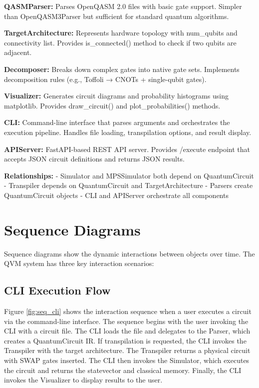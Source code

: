 \textbf{QASMParser:} Parses OpenQASM 2.0 files with basic gate support. Simpler than OpenQASM3Parser but sufficient for standard quantum algorithms.

\textbf{TargetArchitecture:} Represents hardware topology with num\_qubits and connectivity list. Provides is\_connected() method to check if two qubits are adjacent.

\textbf{Decomposer:} Breaks down complex gates into native gate sets. Implements decomposition rules (e.g., Toffoli → CNOTs + single-qubit gates).

\textbf{Visualizer:} Generates circuit diagrams and probability histograms using matplotlib. Provides draw\_circuit() and plot\_probabilities() methods.

\textbf{CLI:} Command-line interface that parses arguments and orchestrates the execution pipeline. Handles file loading, transpilation options, and result display.

\textbf{APIServer:} FastAPI-based REST API server. Provides /execute endpoint that accepts JSON circuit definitions and returns JSON results.

\textbf{Relationships:}
- Simulator and MPSSimulator both depend on QuantumCircuit
- Transpiler depends on QuantumCircuit and TargetArchitecture
- Parsers create QuantumCircuit objects
- CLI and APIServer orchestrate all components

\section{Sequence Diagrams}
Sequence diagrams show the dynamic interactions between objects over time. The QVM system has three key interaction scenarios:

\subsection{CLI Execution Flow}
Figure \ref{fig:seq_cli} shows the interaction sequence when a user executes a circuit via the command-line interface. The sequence begins with the user invoking the CLI with a circuit file. The CLI loads the file and delegates to the Parser, which creates a QuantumCircuit IR. If transpilation is requested, the CLI invokes the Transpiler with the target architecture. The Transpiler returns a physical circuit with SWAP gates inserted. The CLI then invokes the Simulator, which executes the circuit and returns the statevector and classical memory. Finally, the CLI invokes the Visualizer to display results to the user.

